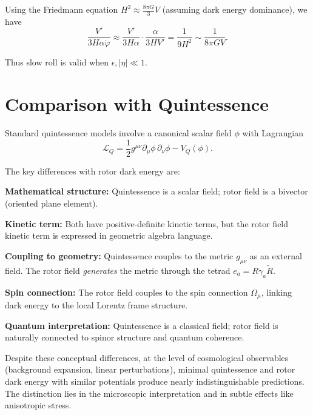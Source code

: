 \documentclass[11pt,a4paper]{article}
\numberwithin{equation}{section}
\theoremstyle{plain}
\theoremstyle{definition}
\theoremstyle{remark}
\begin{document}
Using the Friedmann equation $H^2 \approx \frac{8\pi G}{3}V$ (assuming dark energy dominance), we have
\begin{equation}
\frac{V'}{3H\alpha\dot{\varphi}} \approx \frac{V'}{3H\alpha} \cdot \frac{\alpha}{3HV'} = \frac{1}{9H^2} \sim \frac{1}{8\pi G V}.
\end{equation}

Thus slow roll is valid when $\epsilon, |\eta| \ll 1$.

\section{Comparison with Quintessence}
\label{app:quintessence}

Standard quintessence models involve a canonical scalar field $\phi$ with Lagrangian
\begin{equation}
\mathcal{L}_Q = \frac{1}{2}g^{\mu\nu}\partial_\mu\phi\,\partial_\nu\phi - V_Q(\phi).
\end{equation}

The key differences with rotor dark energy are:

\textbf{Mathematical structure:} Quintessence is a scalar field; rotor field is a bivector (oriented plane element).

\textbf{Kinetic term:} Both have positive-definite kinetic terms, but the rotor field kinetic term is expressed in geometric algebra language.

\textbf{Coupling to geometry:} Quintessence couples to the metric $g_{\mu\nu}$ as an external field. The rotor field \emph{generates} the metric through the tetrad $e_a = R\gamma_a\widetilde{R}$.

\textbf{Spin connection:} The rotor field couples to the spin connection $\Omega_\mu$, linking dark energy to the local Lorentz frame structure.

\textbf{Quantum interpretation:} Quintessence is a classical field; rotor field is naturally connected to spinor structure and quantum coherence.

Despite these conceptual differences, at the level of cosmological observables (background expansion, linear perturbations), minimal quintessence and rotor dark energy with similar potentials produce nearly indistinguishable predictions. The distinction lies in the microscopic interpretation and in subtle effects like anisotropic stress.

\end{document}
